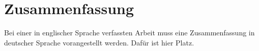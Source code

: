 
\thispagestyle{scrheadings}


\section*{Zusammenfassung}
Bei einer in englischer Sprache verfassten Arbeit muss eine Zusammenfassung in deutscher Sprache vorangestellt werden.
Daf\"ur ist hier Platz.


